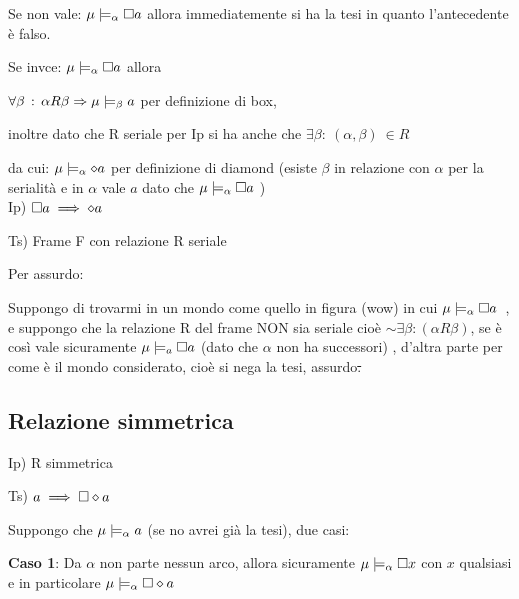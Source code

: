 Se non vale: $\mu\models_{\alpha}\square a$ allora immediatemente si
ha la tesi in quanto l'antecedente è falso.

Se invce: $\mu\models_{\alpha}\square a$ allora

$\forall\beta\,:\,\alpha R\beta\Rightarrow\mu\models_{\beta}a$ per definizione
di box, 

inoltre dato che R seriale per Ip si ha anche che $\exists\beta:\:(\alpha,\beta)\:\in R$ 

da cui: $\mu\models_{\alpha}\diamond a$ per definizione di diamond (esiste
$\beta$ in relazione con $\alpha$ per la serialità e in $\alpha$
vale $a$ dato che $\mu\models_{\alpha}\square a$ )\\

		

Ip) $\square a\implies\diamond a$

Ts) Frame F con relazione R seriale

\begin{center} 
 \end{center}

Per assurdo:

Suppongo di trovarmi in un mondo come quello in figura (wow) in cui
\mbox{$\mu\models_{\alpha}\square a$ }, e suppongo che la relazione
R del frame NON sia seriale cioè $\sim\exists\beta:(\alpha R\beta)$,
se è così vale sicuramente $\mu\models_{a}\square a$ (dato che $\alpha$
non ha successori) , d'altra parte per come è il mondo considerato,
cioè si nega la tesi, assurdo\sout{.} 

\subsection{Relazione simmetrica}

Ip) R simmetrica

Ts) $a\implies\square\diamond a$

Suppongo che $\mu\models_{\alpha}a$ (se no avrei già la tesi), due
casi:

\textbf{Caso 1}: Da $\alpha$ non parte nessun arco, allora sicuramente
$\mu\models_{\alpha}\square x$ con $x$ qualsiasi e in particolare
$\mu\models_{\alpha}\square\diamond a$

